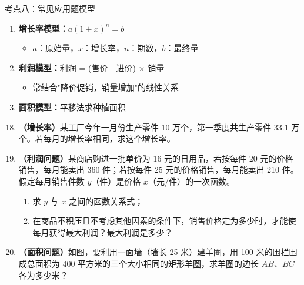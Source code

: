 \documentclass[12pt, a4paper]{article}
\begin{document}
\begin{conceptbox}{考点八：常见应用题模型}
    \begin{enumerate}
        \item \textbf{增长率模型：}$a(1+x)^n = b$
        \begin{itemize}
            \item $a$：原始量，$x$：增长率，$n$：期数，$b$：最终量
        \end{itemize}
        \item \textbf{利润模型：}利润 = (售价 - 进价) $\times$ 销量
        \begin{itemize}
            \item 常结合"降价促销，销量增加"的线性关系
        \end{itemize}
        \item \textbf{面积模型：}平移法求种植面积
    \end{enumerate}
\end{conceptbox}

\begin{examplebox}
    \begin{enumerate}[label=\textbf{例\arabic*.}]
        \setcounter{enumi}{17}
        \item \textbf{（增长率）}某工厂今年一月份生产零件 10 万个，第一季度共生产零件 33.1 万个。若每月的增长率相同，求这个增长率。
        
        \item \textbf{（利润问题）}某商店购进一批单价为 16 元的日用品，若按每件 20 元的价格销售，每月能卖出 360 件；若按每件 25 元的价格销售，每月能卖出 210 件。假定每月销售件数 $y$（件）是价格 $x$（元/件）的一次函数。
        \begin{enumerate}
            \item[(1)] 求 $y$ 与 $x$ 之间的函数关系式；
            \item[(2)] 在商品不积压且不考虑其他因素的条件下，销售价格定为多少时，才能使每月获得最大利润？最大利润是多少？
        \end{enumerate}
        
        \item \textbf{（面积问题）}如图，要利用一面墙（墙长 25 米）建羊圈，用 100 米的围栏围成总面积为 400 平方米的三个大小相同的矩形羊圈，求羊圈的边长 $AB$、$BC$ 各为多少米？
        
        \begin{center}
        \end{center}
    \end{enumerate}
\end{examplebox}
\end{document}
